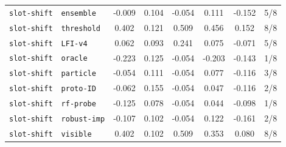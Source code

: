 \documentclass{article}
\begin{document}
\begin{center}
{\begin{tabular}{llcccccc}
\texttt{slot-shift} & \texttt{ensemble} & -0.009 & 0.104 & -0.054 & 0.111 & -0.152 & 5/8 \\
\texttt{slot-shift} & \texttt{threshold} & 0.402 & 0.121 & 0.509 & 0.456 & 0.152 & 8/8 \\
\texttt{slot-shift} & \texttt{LFI-v4} & 0.062 & 0.093 & 0.241 & 0.075 & -0.071 & 5/8 \\
\texttt{slot-shift} & \texttt{oracle} & -0.223 & 0.125 & -0.054 & -0.203 & -0.143 & 1/8 \\
\texttt{slot-shift} & \texttt{particle} & -0.054 & 0.111 & -0.054 & 0.077 & -0.116 & 3/8 \\
\texttt{slot-shift} & \texttt{proto-ID} & -0.062 & 0.155 & -0.054 & 0.047 & -0.116 & 2/8 \\
\texttt{slot-shift} & \texttt{rf-probe} & -0.125 & 0.078 & -0.054 & 0.044 & -0.098 & 1/8 \\
\texttt{slot-shift} & \texttt{robust-imp} & -0.107 & 0.102 & -0.054 & 0.122 & -0.161 & 2/8 \\
\texttt{slot-shift} & \texttt{visible} & 0.402 & 0.102 & 0.509 & 0.353 & 0.080 & 8/8 \\
\bottomrule
\end{tabular}%
}
\end{center}
\normalsize
\end{document}
